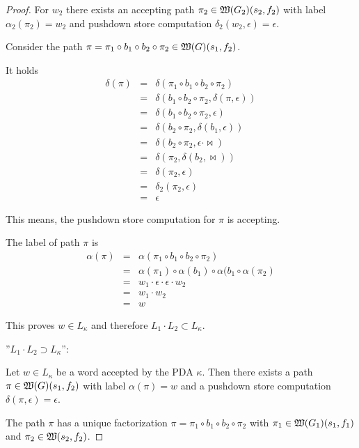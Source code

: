 \begin{proof}
For $w_2$ there exists an accepting path $\pi_2 \in \mbox{$\mathfrak{W}(G_2)$}(s_2,
f_2)$ with label $\alpha_2(\pi_2) = w_2$ and pushdown store computation
$\delta_2(w_2, \epsilon) = \epsilon$.

Consider the path $\pi = \pi_1 \circ b_1 \circ b_2 \circ \pi_2 \in
\mbox{$\mathfrak{W}(G)$}(s_1, f_2)$.

It holds
\begin{eqnarray*}
\delta(\pi) &=& \delta(\pi_1 \circ b_1 \circ b_2 \circ \pi_2) \\
&=& \delta(b_1 \circ b_2 \circ \pi_2, \delta(\pi, \epsilon)) \\
&=& \delta(b_1 \circ b_2 \circ \pi_2, \epsilon) \\
&=& \delta(b_2 \circ \pi_2, \delta(b_1, \epsilon)) \\
&=& \delta(b_2 \circ \pi_2, \epsilon \cdot \Join) \\
&=& \delta(\pi_2, \delta(b_2, \Join)) \\
&=& \delta(\pi_2, \epsilon) \\
&=& \delta_2(\pi_2, \epsilon) \\
&=& \epsilon
\end{eqnarray*}

This means, the pushdown store computation for $\pi$ is accepting.

The label of path $\pi$ is
\begin{eqnarray*}
\alpha(\pi) &=& \alpha(\pi_1 \circ b_1 \circ b_2 \circ \pi_2) \\
&=& \alpha(\pi_1) \circ \alpha(b_1) \circ \alpha(b_1 \circ \alpha(\pi_2) \\
&=& w_1 \cdot \epsilon \cdot \epsilon \cdot w_2 \\
&=& w_1 \cdot w_2 \\
&=& w
\end{eqnarray*}

This proves $w \in L_{\kappa}$ and therefore $L_1 \cdot L_2 \subset L_{\kappa}$.

''$L_1 \cdot L_2 \supset L_{\kappa}$'':

Let $w \in L_{\kappa}$ be a word accepted by the PDA $\kappa$. Then there exists
a path $\pi \in \mbox{$\mathfrak{W}(G)$}(s_1, f_2)$ with label $\alpha(\pi) = w$ and a
pushdown store computation $\delta(\pi, \epsilon) = \epsilon$.

The path $\pi$ has a unique factorization $\pi = \pi_1 \circ b_1 \circ b_2
\circ \pi_2$ with $\pi_1 \in \mbox{$\mathfrak{W}(G_1)$}(s_1, f_1)$ and $\pi_2 \in
\mbox{$\mathfrak{W}(s_2, f_2)$}$. 


\end{proof}
